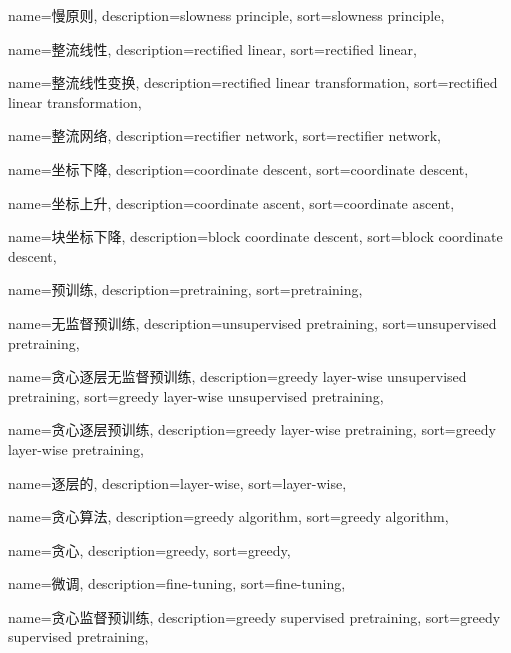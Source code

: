 {
  name=慢原则,
  description={slowness principle},
  sort={slowness principle},
}

{
  name=整流线性,
  description={rectified linear},
  sort={rectified linear},
}

{
  name=整流线性变换,
  description={rectified linear transformation},
  sort={rectified linear transformation},
}

{
  name=整流网络,
  description={rectifier network},
  sort={rectifier network},
}

{
  name=坐标下降,
  description={coordinate descent},
  sort={coordinate descent},
}

{
  name=坐标上升,
  description={coordinate ascent},
  sort={coordinate ascent},
}

{
  name=块坐标下降,
  description={block coordinate descent},
  sort={block coordinate descent},
}

{
  name=预训练,
  description={pretraining},
  sort={pretraining},
}

{
  name=无监督预训练,
  description={unsupervised pretraining},
  sort={unsupervised pretraining},
}

{
  name=贪心逐层无监督预训练,
  description={greedy layer-wise unsupervised pretraining},
  sort={greedy layer-wise unsupervised pretraining},
}

{
  name=贪心逐层预训练,
  description={greedy layer-wise pretraining},
  sort={greedy layer-wise pretraining},
}

{
  name=逐层的,
  description={layer-wise},
  sort={layer-wise},
}

{
  name=贪心算法,
  description={greedy algorithm},
  sort={greedy algorithm},
}

{
  name=贪心,
  description={greedy},
  sort={greedy},
}

{
  name=微调,
  description={fine-tuning},
  sort={fine-tuning},
}

{
  name=贪心监督预训练,
  description={greedy supervised pretraining},
  sort={greedy supervised pretraining},
}

